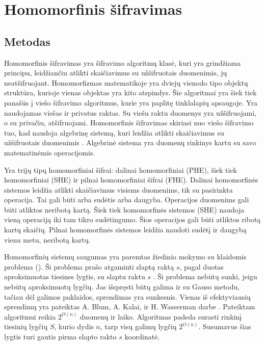 \documentclass{VUMIFInfBakalaurinis}
\begin{document}
\section{Homomorfinis šifravimas}
\subsection{Metodas}
\par Homomorfinis šifravimas yra šifravimo algoritmų klasė, kuri yra grindžiama principu, leidžiančiu atlikti skaičiavimus su užšifruotais duomenimis, jų neatšifruojant. Homomorfizmas matematikoje yra dviejų vienodo tipo objektų struktūra, kurioje vienas objektas yra kito atspindys.  Šie algoritmai yra šiek tiek panašūs į viešo šifravimo algoritmus, kurie yra paplitę tinklalapių apsaugoje. Yra naudojamas viešas ir privatus raktas. Su viešu raktu duomenys yra užšifruojami, o su privačiu, atšifruojami. Homomorfinis šifravimas skiriasi nuo viešo šifravimo tuo, kad naudoja algebrinę sistemą, kuri leidžia atlikti skaičiavimus su užšifruotais duomenimis \cite{14}. Algebrinė sistema yra duomenų rinkinys kartu su savo matematinėmis operacijomis.
\par Yra trijų tipų homomorfiniai šifrai: dalinai homomorfiniai (PHE), šiek tiek homomorfiniai (SHE) ir pilnai homomorfiniai šifrai (FHE). Dalinai homomorfinės sistemos leidžia atlikti skaičiavimus visiems duomenims, tik su pasirinkta operacija. Tai gali būti arba sudėtis arba daugyba.  Operacijos duomenims gali būti atliktos neribotą kartą.  Šiek tiek homomorfinės sistemos (SHE) naudoja vieną operaciją iki tam tikro sudėtingumo. Šios operacijos gali būti atliktos ribotą kartų skaičių. Pilnai homomorfinės sistemos leidžia naudoti sudėtį ir daugybą vienu metu, neribotą kartų. 
\par Homomorfinių sistemų saugumas yra paremtas žiedinio mokymo su klaidomis problema (). Ši problema prašo atgaminti slaptą raktą $s$, pagal duotas aproksimuotas tiesines lygtis, su slaptu raktu $s$ \cite{16}. Ši problema nebūtų sunki, jeigu nebūtų aproksimuotų lygčių. Jas išspręsti būtų galima ir su Gauso metodu, tačiau dėl galimos paklaidos, sprendimas yra sunkesnis. Vienas iš efektyviausių sprendimų yra pateiktas A. Blum, A. Kalai, ir H. Wasserman darbe \cite{15}. Pateiktam algoritmui reikia $2^{O(n)}$ duomenų ir laiko. Algoritmas padeda surasti rinkinį tiesinių lygčių $S$, kurio dydis $n$, tarp visų galimų lygčių $2^{O(n)}$. Susumavus šias lygtis turi gautis pirma slapto rakto $s$ koordinatė.
\end{document}
